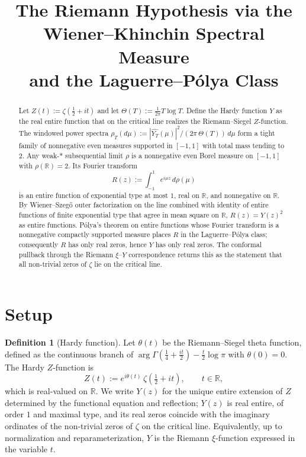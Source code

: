 \documentclass[11pt]{article}
\title{The Riemann Hypothesis via the Wiener--Khinchin Spectral Measure\\
and the Laguerre--P\'olya Class}
\author{}
\date{}
\theoremstyle{definition}
\newtheorem{definition}[theorem]{Definition}
\theoremstyle{remark}
\begin{document}
\maketitle

\begin{abstract}
Let $Z(t) := \zeta\!\left(\tfrac12 + it\right)$ and let $\Theta(T) := \tfrac{1}{2\pi} T \log T$. Define the Hardy function $Y$ as the real entire function that on the critical line realizes the Riemann--Siegel $Z$-function. The windowed power spectra $\rho_T(d\mu) := |\widehat{Y_T}(\mu)|^2 / (2\pi\,\Theta(T))\, d\mu$ form a tight family of nonnegative even measures supported in $[-1,1]$ with total mass tending to $2$. Any weak-$*$ subsequential limit $\rho$ is a nonnegative even Borel measure on $[-1,1]$ with $\rho(\mathbb R)=2$. Its Fourier transform
\[
R(z) := \int_{-1}^{1} e^{i\mu z}\, d\rho(\mu)
\]
is an entire function of exponential type at most $1$, real on $\mathbb R$, and nonnegative on $\mathbb R$. By Wiener--Szeg\H{o} outer factorization on the line combined with identity of entire functions of finite exponential type that agree in mean square on $\mathbb R$, $R(z) = Y(z)^2$ as entire functions. P\'olya's theorem on entire functions whose Fourier transform is a nonnegative compactly supported measure places $R$ in the Laguerre--P\'olya class; consequently $R$ has only real zeros, hence $Y$ has only real zeros. The conformal pullback through the Riemann $\xi$--$Y$ correspondence returns this as the statement that all non-trivial zeros of $\zeta$ lie on the critical line.
\end{abstract}

\section{Setup}

\begin{definition}[Hardy function]
Let $\theta(t)$ be the Riemann--Siegel theta function, defined as the continuous branch of $\arg \Gamma(\tfrac14 + \tfrac{it}{2}) - \tfrac{t}{2}\log \pi$ with $\theta(0)=0$. The Hardy $Z$-function is
\[
Z(t) := e^{i\theta(t)}\, \zeta\!\left(\tfrac12 + it\right), \qquad t \in \mathbb R,
\]
which is real-valued on $\mathbb R$. We write $Y(z)$ for the unique entire extension of $Z$ determined by the functional equation and reflection; $Y(z)$ is real entire, of order $1$ and maximal type, and its real zeros coincide with the imaginary ordinates of the non-trivial zeros of $\zeta$ on the critical line. Equivalently, up to normalization and reparameterization, $Y$ is the Riemann $\xi$-function expressed in the variable $t$.
\end{definition}
\end{document}
